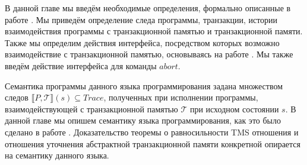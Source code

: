 В данной главе мы введём необходимые определения, формально описанные в работе \cite{tms_article}. Мы приведём определение следа программы, транзакции, истории взаимодействия программы с транзакционной памятью и транзакционной памяти. Также мы определим действия интерфейса, посредством которых возможно взаимодействие с транзакционной памятью, основываясь на работе \cite{tms_article}. Мы также введём действие интерфейса для команды $abort$.

Семантика программы данного языка программирования задана множеством следов $\llbracket P, \mathcal{T} \rrbracket (s) \subseteq Trace$, полученных при исполнении программы, взаимодействующей с транзакционной памятью $\mathcal{T}$ при исходном состоянии $s$. В данной главе мы опишем семантику языка программирования, как это было сделано в работе \cite{tms_article}. Доказательство теоремы о равносильности TMS отношения и отношения уточнения абстрактной транзакционной памяти конкретной опирается на семантику данного языка. 

